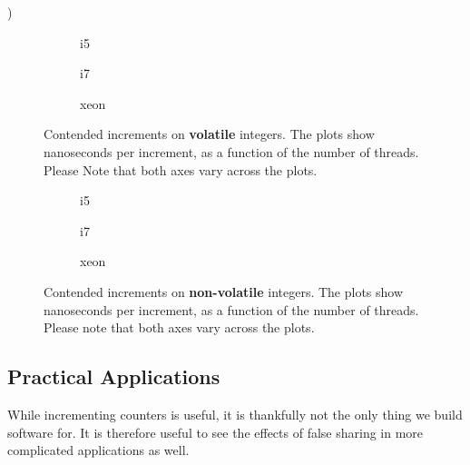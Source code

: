 )

\begin{figure}[hbpt]
	\graphicspath{{plots/}}
	\begin{subfigure}{0.5\textwidth}
		
		\caption{i5}
	\end{subfigure}
	\begin{subfigure}{0.5\textwidth}
		
		\caption{i7}
	\end{subfigure}
	\begin{subfigure}{1\textwidth}
		
		\caption{xeon}
	\end{subfigure}
	\caption{Contended increments on \textbf{volatile} integers. The plots show
	nanoseconds per increment, as a function of the number of threads.
	Please Note that both axes vary across the plots.}
	\label{fig:cont}
\end{figure}

\begin{figure}[hbpt]
	\graphicspath{{plots/}}
	\begin{subfigure}{0.5\textwidth}
		
		\caption{i5}
	\end{subfigure}
	\begin{subfigure}{0.5\textwidth}
		
		\caption{i7}
	\end{subfigure}
	\begin{subfigure}{1\textwidth}
		
		\caption{xeon}
	\end{subfigure}
	\caption{Contended increments on \textbf{non-volatile} integers. The
	plots show nanoseconds per increment, as a function of the number of
	threads. Please note that both axes vary across the plots.}
	\label{fig:cont-nob}
\end{figure}




\subsection{Practical Applications}
While incrementing counters is useful, it is thankfully not the only thing we
build software for. It is therefore useful to see the effects of false sharing in
more complicated applications as well.

